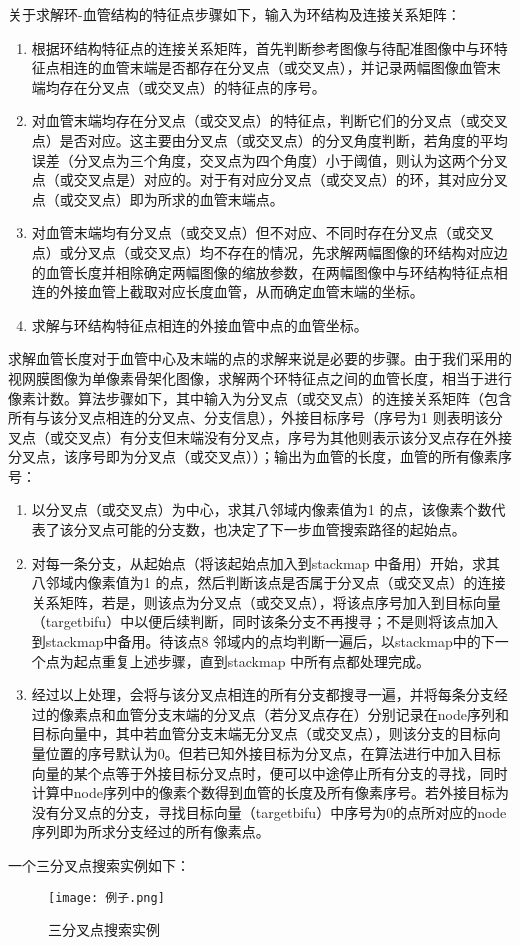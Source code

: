 关于求解环-血管结构的特征点步骤如下，输入为环结构及连接关系矩阵：
\begin{enumerate}
\item 根据环结构特征点的连接关系矩阵，首先判断参考图像与待配准图像中与环特征点相连的血管末端是否都存在分叉点（或交叉点），并记录两幅图像血管末端均存在分叉点（或交叉点）的特征点的序号。
\item 对血管末端均存在分叉点（或交叉点）的特征点，判断它们的分叉点（或交叉点）是否对应。这主要由分叉点（或交叉点）的分叉角度判断，若角度的平均误差（分叉点为三个角度，交叉点为四个角度）小于阈值，则认为这两个分叉点（或交叉点是）对应的。对于有对应分叉点（或交叉点）的环，其对应分叉点（或交叉点）即为所求的血管末端点。
\item 对血管末端均有分叉点（或交叉点）但不对应、不同时存在分叉点（或交叉点）或分叉点（或交叉点）均不存在的情况，先求解两幅图像的环结构对应边的血管长度并相除确定两幅图像的缩放参数，在两幅图像中与环结构特征点相连的外接血管上截取对应长度血管，从而确定血管末端的坐标。
\item 求解与环结构特征点相连的外接血管中点的血管坐标。
\end{enumerate}
  求解血管长度对于血管中心及末端的点的求解来说是必要的步骤。由于我们采用的视网膜图像为单像素骨架化图像，求解两个环特征点之间的血管长度，相当于进行像素计数。算法步骤如下，其中输入为分叉点（或交叉点）的连接关系矩阵（包含所有与该分叉点相连的分叉点、分支信息），外接目标序号（序号为1 则表明该分叉点（或交叉点）有分支但末端没有分叉点，序号为其他则表示该分叉点存在外接分叉点，该序号即为分叉点（或交叉点））；输出为血管的长度，血管的所有像素序号：
\begin{enumerate}
\item 以分叉点（或交叉点）为中心，求其八邻域内像素值为1 的点，该像素个数代表了该分叉点可能的分支数，也决定了下一步血管搜索路径的起始点。
\item 对每一条分支，从起始点（将该起始点加入到stackmap 中备用）开始，求其八邻域内像素值为1 的点，然后判断该点是否属于分叉点（或交叉点）的连接关系矩阵，若是，则该点为分叉点（或交叉点），将该点序号加入到目标向量（targetbifu）中以便后续判断，同时该条分支不再搜寻；不是则将该点加入到stackmap中备用。待该点8 邻域内的点均判断一遍后，以stackmap中的下一个点为起点重复上述步骤，直到stackmap 中所有点都处理完成。
\item 经过以上处理，会将与该分叉点相连的所有分支都搜寻一遍，并将每条分支经过的像素点和血管分支末端的分叉点（若分叉点存在）分别记录在node序列和目标向量中，其中若血管分支末端无分叉点（或交叉点），则该分支的目标向量位置的序号默认为0。但若已知外接目标为分叉点，在算法进行中加入目标向量的某个点等于外接目标分叉点时，便可以中途停止所有分支的寻找，同时计算中node序列中的像素个数得到血管的长度及所有像素序号。若外接目标为没有分叉点的分支，寻找目标向量（targetbifu）中序号为0的点所对应的node序列即为所求分支经过的所有像素点。
\end{enumerate}
一个三分叉点搜索实例如下：
   \begin{figure}[ht!]
   \centering
  \texttt{[image: 例子.png]}
  \caption{三分叉点搜索实例}
 \end{figure}

